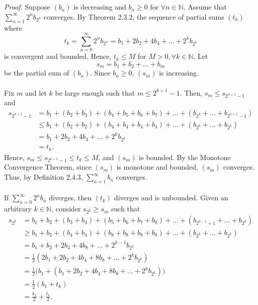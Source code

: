 \documentclass{article}
\begin{document}
                \\ \\
                \textit{Proof.} Suppose $(b_n)$ is decreasing and $b_n \geq 0$ for $\forall n \in \mathbb{N}$. Assume that $\sum_{n=1}^\infty 2^n b_{2^n}$ converges. By Theorem 2.3.2, the sequence of partial sums $(t_k)$ where
                \begin{equation*}
                    t_k = \sum_{n=0}^\infty 2^n b_{2^n} = b_1 + 2b_2 + 4b_4 + \dots + 2^kb_{2^k}
                \end{equation*}
                is convergent and bounded. Hence, $t_k \leq M$ for $M>0, \forall k \in \mathbb{N}$. Let
                \begin{equation*}
                    s_m = b_1+b_2+\dots+b_m
                \end{equation*}
                be the partial sum of $(b_n)$. Since $b_n \geq 0$, $(s_m)$ is increasing. \\ \\
                Fix $m$ and let $k$ be large enough such that $m \leq 2^{k+1}-1$. Then, $s_m \leq s_{2^{k+1}-1}$ and
                \begin{align*}
                    s_{2^{k+1}-1} & = b_1 + (b_2 + b_3) + (b_4 + b_5 + b_6 + b_7) + \dots + (b_{2^k} + \dots + b_{2^{k+1}-1}) \\ 
                    & \leq b_1 + (b_2 + b_2) + (b_4 + b_4 + b_4 + b_4) + \dots + (b_{2^k} + \dots + b_{2^k}) \\
                    & = b_1 + 2b_2 + 4b_4 + \dots + 2^kb_{2^k} \\
                    & = t_k.
                \end{align*}
                Hence, $s_m \leq s_{2^{k+1}-1} \leq t_k \leq M$, and $(s_m)$ is bounded. By the Monotone Convergence Theorem, since $(s_m)$ is monotone and bounded, $(s_m)$ converges. Thus, by Definition 2.4.3, $\sum_{n=1}^\infty b_n$ converges. \\ \\
                If $\sum_{n=0}^\infty 2^nb_n$ diverges, then $(t_k)$ diverges and is unbounded. Given an arbitrary $k \in \mathbb{N}$, consider $s_{2^k} \geq s_m$ such that
                \begin{align*}
                    s_{2^k} & = b_1 + b_2 + (b_3 + b_4) + (b_5 + b_6 + b_7 + b_8) + \dots + (b_{2^{k-1}+1} + \dots + b_{2^k}) \\
                    & \geq b_1 + b_2 + (b_4 + b_4) + (b_8 + b_8 + b_8 + b_8) + \dots + (b_{2^k} + \dots + b_{2^k}) \\
                    & = b_1 + b_2 + 2b_4 + 4b_8 + \dots + 2^{k-1}b_{2^k} \\
                    & = \frac{1}{2}(2b_1 + 2b_2 + 4b_4 + 8b_8 + \dots + 2^k b_{2^k}) \\
                    & = \frac{1}{2}\big(b_1 + (b_1 + 2b_2 + 4b_4 + 8b_8 + \dots + 2^k b_{2^k})\big) \\
                    & = \frac{1}{2}(b_1 + t_k) \\
                    & = \frac{b_1}{2} + \frac{t_k}{2}.
                \end{align*}
\end{document}

